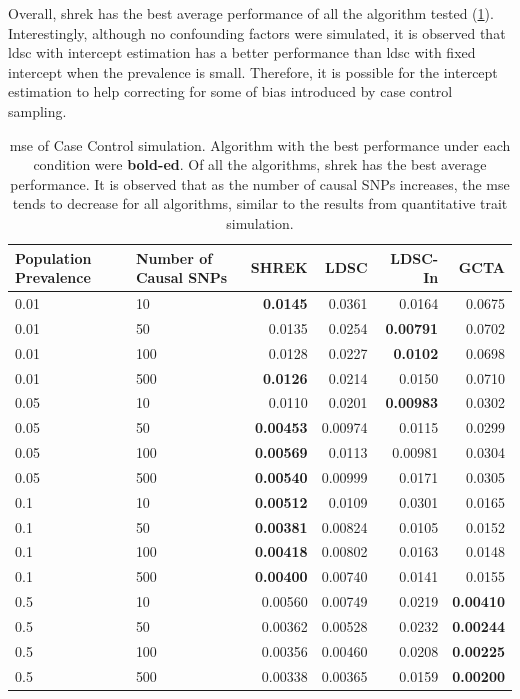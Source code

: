 		Overall, \gls{shrek} has the best average performance of all the algorithm tested (\cref{tab:mseCC}).
		Interestingly, although no confounding factors were simulated, it is observed that \gls{ldsc} with intercept estimation has a better performance than \gls{ldsc} with fixed intercept when the prevalence is small.
		Therefore, it is possible for the intercept estimation to help correcting for some of bias introduced by case control sampling.
		
\begin{table}
	\centering
	\begin{tabular}{p{2cm}p{2.4cm}rrrr}
		\toprule
		Population Prevalence&	Number of Causal SNPs&	SHREK&	LDSC&	LDSC-In&	GCTA \\
		\midrule
		0.01&	10&	\textbf{0.0145}&	0.0361&	0.0164&	0.0675\\
		0.01&	50&	0.0135&	0.0254&	\textbf{0.00791}&	0.0702\\
		0.01&	100&	0.0128&	0.0227&	\textbf{0.0102}&	0.0698\\
		0.01&	500&	\textbf{0.0126}&	0.0214&	0.0150&	0.0710\\
		0.05&	10&	0.0110&	0.0201&	\textbf{0.00983}&	0.0302\\
		0.05&	50&	\textbf{0.00453}&	0.00974&	0.0115&	0.0299\\
		0.05&	100&	\textbf{0.00569}&	0.0113&	0.00981&	0.0304\\
		0.05&	500&	\textbf{0.00540}&	0.00999&	0.0171&	0.0305\\
		0.1&	10&	\textbf{0.00512}&	0.0109&	0.0301&	0.0165\\
		0.1&	50&	\textbf{0.00381}&	0.00824&	0.0105&	0.0152\\
		0.1&	100&	\textbf{0.00418}&	0.00802&	0.0163&	0.0148\\
		0.1&	500&	\textbf{0.00400}&	0.00740&	0.0141&	0.0155\\
		0.5&	10&	0.00560&	0.00749&	0.0219&	\textbf{0.00410}\\
		0.5&	50&	0.00362&	0.00528&	0.0232&	\textbf{0.00244}\\
		0.5&	100&	0.00356&	0.00460&	0.0208&	\textbf{0.00225}\\
		0.5&	500&	0.00338&	0.00365&	0.0159&	\textbf{0.00200}\\
		\bottomrule
	\end{tabular}
	\caption[MSE of Case Control Simulation]{
		\Gls{mse} of Case Control simulation.
		Algorithm with the best performance under each condition were \textbf{bold-ed}.
		Of all the algorithms, \gls{shrek} has the best average performance.
		It is observed that as the number of causal \glspl{SNP} increases, the \gls{mse} tends to decrease for all algorithms, similar to the results from quantitative trait simulation.
	}
	\label{tab:mseCC}
\end{table}

